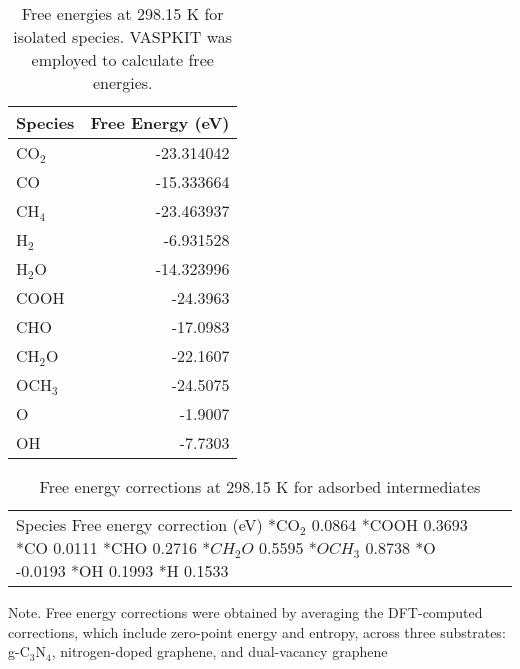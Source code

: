 \begin{table}[h]
    \centering
    \begin{tabular}{lr}
      \hline
      \textbf{Species} & \textbf{Free Energy (eV)} \\
      \hline
      CO$_2$ & -23.314042 \\
      CO & -15.333664 \\
      CH$_4$ & -23.463937 \\
      H$_2$ & -6.931528 \\
      H$_2$O & -14.323996 \\
      COOH & -24.3963 \\
      CHO & -17.0983 \\
      CH$_2$O & -22.1607 \\
      OCH$_3$ & -24.5075 \\
      O & -1.9007 \\
      OH & -7.7303 \\
      \hline
    \end{tabular}
    \caption{Free energies at 298.15 K for isolated species. VASPKIT \cite{wang2021vaspkit} was employed to calculate free energies.}
    \label{si_table2:species_free_energies}
\end{table}


\begin{table}[h]
    \centering
    \begin{tabular}{lr}
      \hline
      Species	Free energy correction (eV)
      \hline
      *CO$_2$	0.0864
      *COOH	0.3693
      *CO	0.0111
      *CHO	0.2716
      *$CH_2O$	0.5595
      *$OCH_3$	0.8738
      *O	-0.0193
      *OH	0.1993
      *H	0.1533
      \hline
    \end{tabular}
    \caption{Free energy corrections at 298.15 K for adsorbed intermediates}
    \label{si_table3}
\end{table}
Note. Free energy corrections were obtained by averaging the DFT-computed corrections, which include zero-point energy and entropy, across three substrates: g-C$_3$N$_4$, nitrogen-doped graphene, and dual-vacancy graphene


